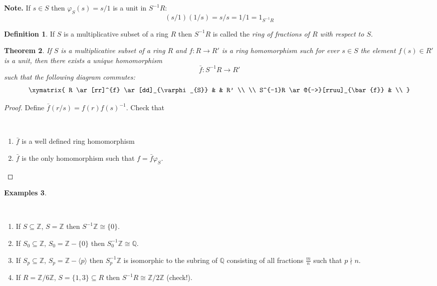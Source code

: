 \documentclass[12pt, letterpaper, oneside]{article}
\theoremstyle{plain}
\newtheorem{theorem}{Theorem}[section]
\theoremstyle{definition}
\newtheorem{definition}[theorem]{Definition}
\newtheorem{examples}[theorem]{Examples}
\newcommand{\Z}{{\mathbb Z}}
\newcommand{\Q}{{\mathbb Q}}
\newcommand{\subgp}[1]{\langle#1\rangle}
\newcommand{\benu}{\begin{enumerate}}
\newcommand{\eenu}{\end{enumerate}}
\newcommand{\vs}{\vskip 5mm}
\newcommand{\isep}[1][0]{\setlength{\itemsep}{#1 mm}}
\begin{document}
 \vs
 
 \textbf{Note.} If $s\in S$ then $\varphi_{S}(s) = s/1$ is a unit in $S^{-1}R$:
 $$(s/1)(1/s) = s/s = 1/1 =1_{S^{-1}R} $$
 
 \vs\vs
 
 
 \begin{definition}
 If $S$ is a multiplicative subset of a ring $R$ then $S^{-1}R$ is called the \emph{ring of fractions
 of $R$ with respect to $S$}.
 \end{definition}
 
 \vs\vs
 
\begin{theorem}
\label{THM_UNIVPROPRINGLOC}
If $S$ is a multiplicative subset of a ring $R$  and $f\colon R \to R'$ is a ring homomorphism 
such for ever $s\in S$ the element  $f(s)\in R'$ is a unit, then there exists a unique homomorphism 
$$\bar{f}\colon S^{-1}R \to R'$$
such that the following diagram commutes:
$$
\xymatrix{
R \ar[rr]^{f} \ar[dd]_{\varphi_{S}} & & R' \\
\\
S^{-1}R \ar@{-->}[rruu]_{\bar{f}} & \\
}
$$

\end{theorem}

\vs

\begin{proof}
Define $\bar{f}(r/s) = f(r)f(s)^{-1}$. Check that 

\vskip -13mm

\  
\benu
\isep[0]
\item $\bar{f}$ is a well defined ring homomorphism
\item $\bar{f}$ is the only homomorphism such that $f = \bar{f}\varphi_{S}$. 
\eenu
\end{proof}

\vs\vs

\begin{examples}\ 

\vskip -13mm

\ 
\benu
\isep[5]
\item If $S\subseteq \Z$, $S = \Z$ then $S^{-1}\Z \cong \{0\}$.
\item  If $S_{0}\subseteq \Z$, $S_{0} = \Z-\{0\}$ then $S^{-1}_{0}\Z \cong\Q$.
\item  If $S_{p}\subseteq \Z$, $S_{p} = \Z-\subgp{p}$ then $S^{-1}_{p}\Z$ is isomorphic
to the subring of $\Q$ consisting of all fractions $\frac{m}{n}$ such that $p\nmid n$.
\item If $R=\Z/6\Z$, $S= \{1,3\}\subseteq R$ then $S^{-1}R \cong \Z/2\Z$ (check!).  
\eenu
 
\end{examples} 
 
\end{document}
